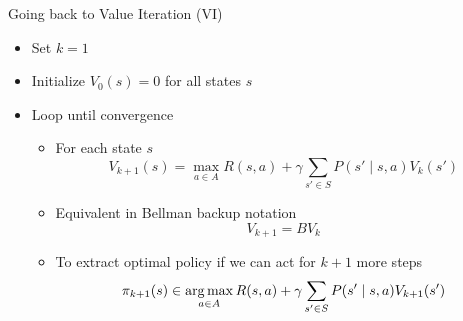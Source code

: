 \documentclass[aspectratio=169]{../latex_main/tntbeamer}  %
\begin{document}
\begin{frame}[c]{Going back to Value Iteration (VI)}

\begin{itemize}
	\item  Set $k = 1$
	\item Initialize $V_0(s) = 0$ for all states $s$
	\item Loop until convergence
	\begin{itemize}
		\item For each state $s$
		$$V_{k+1}(s) = \max_{a\in A } R(s,a) + \gamma \sum_{s' \in S } P(s' \mid s,a) V_k(s') $$
		\item Equivalent in Bellman backup notation
				$$ V_{k+1} = BV_k$$
		\item To extract optimal policy if we can act for $k+1$ more steps
		$$\pi_{k+1}(s) \in \operatorname*{arg\,max}_{a \in A} R(s,a) + \gamma \sum_{s' \in S} P(s' \mid s,a) V_{k+1}(s') $$
	\end{itemize}
	
\end{itemize}

\end{frame}
%
%

\end{document}
